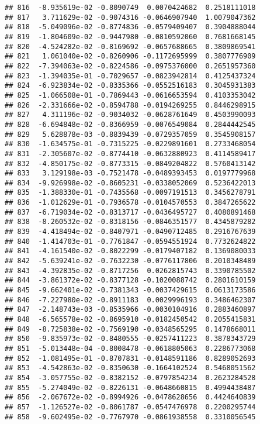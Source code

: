 \documentclass[
]{article}
\begin{document}
\begin{verbatim}
## 816  -8.935619e-02 -0.8090749  0.0070424682  0.2518111018
## 817   3.711629e-02 -0.9074316 -0.0646907940  1.0079047362
## 818  -5.049096e-02 -0.8774836 -0.0579409407  0.3904888044
## 819  -1.804609e-02 -0.9447980 -0.0810592060  0.7681668145
## 820  -4.524282e-02 -0.8169692 -0.0657688665  0.3809869541
## 821   1.061040e-02 -0.8260906 -0.1172695999  0.3807776909
## 822  -7.394063e-02 -0.8224586 -0.0975376000  0.2651957360
## 823  -1.394035e-01 -0.7029657 -0.0823942814  0.4125437324
## 824  -6.923834e-02 -0.8335366 -0.0552516183  0.3045931383
## 825  -1.066508e-01 -0.7869443 -0.0616653594  0.4103353042
## 826  -2.331666e-02 -0.8594788 -0.0194269255  0.8446298915
## 827   4.311196e-02 -0.9034032 -0.0628761649  0.4503990093
## 828  -6.694848e-02 -0.8366959 -0.0076549084  0.2844442545
## 829   5.628878e-03 -0.8839439 -0.0729357059  0.3545908157
## 830  -1.634575e-01 -0.7315225 -0.0229891601  0.2733468054
## 831  -2.305607e-02 -0.8774410 -0.0632880923  0.4114589417
## 832  -4.850175e-02 -0.8773315 -0.0849204822  0.5760413142
## 833   3.129198e-03 -0.7521478 -0.0489393453  0.0197779968
## 834  -9.926998e-02 -0.8605231 -0.0338052069  0.5236422013
## 835  -1.388330e-01 -0.7435568 -0.0097191513  0.3456278791
## 836  -1.012629e-01 -0.7936578 -0.0104570553  0.3847265622
## 837  -6.719034e-02 -0.8313717 -0.0436495727  0.4080891468
## 838  -8.260532e-02 -0.8318156 -0.0846351577  0.4345879282
## 839  -4.418494e-02 -0.8407971 -0.0490712485  0.2916767639
## 840  -1.414703e-01 -0.7761847 -0.0594551924  0.7732624822
## 841  -4.161540e-02 -0.8022299 -0.0179407182  0.1369080033
## 842  -5.639241e-02 -0.7632230 -0.0776117806  0.2010348489
## 843  -4.392835e-02 -0.8717256  0.0262815743  0.3390785502
## 844  -3.861372e-02 -0.8377128 -0.1020088742  0.2801610159
## 845  -9.662401e-02 -0.7381343 -0.0037429615  0.0613173586
## 846  -7.227980e-02 -0.8911183  0.0029996193  0.3486462307
## 847  -2.148743e-03 -0.8535966 -0.0030104916  0.2883460897
## 848  -6.565578e-02 -0.8695910 -0.0182450542  0.2055415831
## 849  -8.725838e-02 -0.7569190 -0.0348565295  0.1478668011
## 850  -9.835973e-02 -0.8480555 -0.0257411223  0.3878343729
## 851  -5.013448e-04 -0.8008478 -0.0618805063  0.2286773068
## 852  -1.081495e-01 -0.8707831 -0.0148591186  0.8289052693
## 853  -4.542863e-02 -0.8350630 -0.1664102524  0.5468051562
## 854  -3.057755e-02 -0.8382152 -0.0797854234  0.2623284528
## 855  -5.274049e-02 -0.8226131 -0.0648660815  0.4994438487
## 856  -2.067672e-02 -0.8994926 -0.0478628656  0.4424640839
## 857  -1.126527e-02 -0.8061787 -0.0547476978  0.2200295744
## 858  -9.602495e-02 -0.7767970 -0.0861938558  0.3310056545

\end{verbatim}
\end{document}

